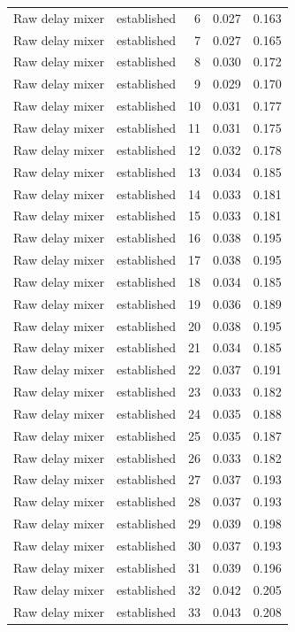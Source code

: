 \begin{tabular}{llrrr}
Raw delay mixer & established & 6 & 0.027 & 0.163 \\
Raw delay mixer & established & 7 & 0.027 & 0.165 \\
Raw delay mixer & established & 8 & 0.030 & 0.172 \\
Raw delay mixer & established & 9 & 0.029 & 0.170 \\
Raw delay mixer & established & 10 & 0.031 & 0.177 \\
Raw delay mixer & established & 11 & 0.031 & 0.175 \\
Raw delay mixer & established & 12 & 0.032 & 0.178 \\
Raw delay mixer & established & 13 & 0.034 & 0.185 \\
Raw delay mixer & established & 14 & 0.033 & 0.181 \\
Raw delay mixer & established & 15 & 0.033 & 0.181 \\
Raw delay mixer & established & 16 & 0.038 & 0.195 \\
Raw delay mixer & established & 17 & 0.038 & 0.195 \\
Raw delay mixer & established & 18 & 0.034 & 0.185 \\
Raw delay mixer & established & 19 & 0.036 & 0.189 \\
Raw delay mixer & established & 20 & 0.038 & 0.195 \\
Raw delay mixer & established & 21 & 0.034 & 0.185 \\
Raw delay mixer & established & 22 & 0.037 & 0.191 \\
Raw delay mixer & established & 23 & 0.033 & 0.182 \\
Raw delay mixer & established & 24 & 0.035 & 0.188 \\
Raw delay mixer & established & 25 & 0.035 & 0.187 \\
Raw delay mixer & established & 26 & 0.033 & 0.182 \\
Raw delay mixer & established & 27 & 0.037 & 0.193 \\
Raw delay mixer & established & 28 & 0.037 & 0.193 \\
Raw delay mixer & established & 29 & 0.039 & 0.198 \\
Raw delay mixer & established & 30 & 0.037 & 0.193 \\
Raw delay mixer & established & 31 & 0.039 & 0.196 \\
Raw delay mixer & established & 32 & 0.042 & 0.205 \\
Raw delay mixer & established & 33 & 0.043 & 0.208 \\

\end{tabular}

